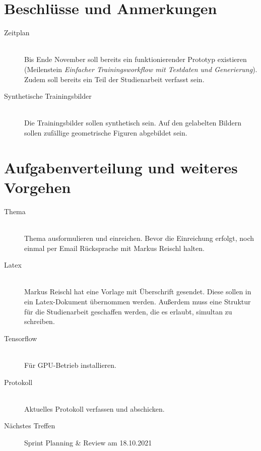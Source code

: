 \section{Beschlüsse und Anmerkungen}
\begin{description}
	\item[Zeitplan] \hfill \\
	Bis Ende November soll bereits ein funktionierender Prototyp existieren (Meilenstein \textit{Einfacher Trainingsworkflow mit Testdaten und Generierung}). Zudem soll bereits ein Teil der Studienarbeit verfasst sein.
	\item[Synthetische Trainingsbilder] \hfill \\
	Die Trainingsbilder sollen synthetisch sein. Auf den gelabelten Bildern sollen zufällige geometrische Figuren abgebildet sein.
\end{description}

\section{Aufgabenverteilung und weiteres Vorgehen}
\begin{description}
	\item[Thema]  \\
	Thema ausformulieren und einreichen. Bevor die Einreichung erfolgt, noch einmal per Email Rücksprache mit Markus Reischl halten.
	
	\item[Latex] \hfill {}\\
	Markus Reischl hat eine Vorlage mit Überschrift gesendet. Diese sollen in ein Latex-Dokument übernommen werden. Außerdem muss eine Struktur für die Studienarbeit geschaffen werden, die es erlaubt, simultan zu schreiben. 
	
	\item[Tensorflow] \hfill {}\\
	Für GPU-Betrieb installieren.
	
	\item[Protokoll]  \\
	Aktuelles Protokoll verfassen und abschicken.
	
	\item[Nächstes Treffen] Sprint Planning \& Review am 18.10.2021
\end{description}
